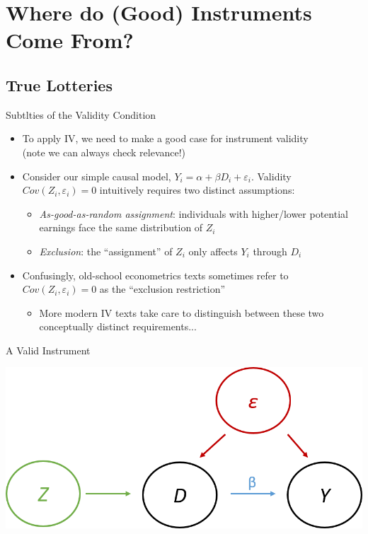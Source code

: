 \documentclass{beamer}
\begin{document}

\section{Where do (Good) Instruments Come From?}

\subsection{True Lotteries}
\begin{frame}{Subtlties of the Validity Condition}
\begin{itemize}
\item To apply IV, we need to make a good case for instrument validity \\ (note we can always check relevance!)\pause{}
\medskip
\item Consider our simple causal model, $Y_i=\alpha+\beta D_i+\varepsilon_i$. Validity $Cov(Z_i,\varepsilon_i)=0$ intuitively requires two distinct assumptions:\smallskip\pause{}
\begin{itemize}
\item \emph{As-good-as-random assignment}: individuals with higher/lower potential earnings face the same distribution of $Z_i$\smallskip
\item \emph{Exclusion}: the ``assignment'' of $Z_i$ only affects $Y_i$ through $D_i$
\end{itemize}
\medskip\pause{}

\item Confusingly, old-school econometrics texts sometimes refer to $Cov(Z_i,\varepsilon_i)=0$ as the ``exclusion restriction''
\smallskip\pause{}

\begin{itemize}
\item More modern IV texts take care to distinguish between these two conceptually distinct requirements... 
\end{itemize}
\end{itemize}
\end{frame}

\begin{frame}{A Valid Instrument}
\begin{center}
\includegraphics[scale=0.6]{./lecture_includes/dag3.png}
\end{center}
\end{frame}
\end{document}
